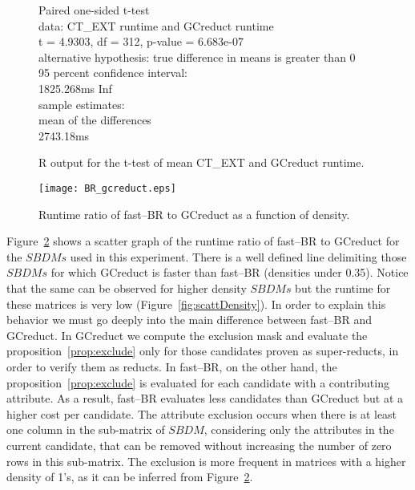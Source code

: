 \documentclass[authoryear,preprint,review,12pt]{elsarticle}
\begin{document}
	\begin{figure}
		\qquad{}	Paired one-sided t-test\\

		data:  CT\_EXT runtime and GCreduct runtime\\
		t = 4.9303, df = 312, p-value = 6.683e-07\\
		alternative hypothesis: true difference in means is greater than 0\\
		95 percent confidence interval:\\
		 1825.268ms  \qquad{}  Inf\\
		sample estimates:\\
		mean of the differences \\
		 \qquad{}    2743.18ms
		 
		\centering
	  	\caption{R output for the t-test of mean CT\_EXT and GCreduct runtime.}
	  	\label{fig:R_GCreduct}
	  	
	\end{figure}
		\begin{figure}[htb]
			\begin{center}
				\texttt{[image: BR\_gcreduct.eps]}
			\end{center}
			\caption{Runtime ratio of fast--BR to GCreduct as a function of density.}
			\label{fig:BRvsGAP}	
		\end{figure}
		
	Figure~\ref{fig:BRvsGAP} shows a scatter graph of the runtime ratio of fast--BR to GCreduct for the $SBDMs$ used in	this experiment. There is a well defined line delimiting those $SBDMs$ for which GCreduct is faster than fast--BR (densities under 0.35). Notice that the same can be observed for higher density $SBDMs$ but the runtime for these matrices is very low (Figure~\ref{fig:scattDensity}). In order to explain this behavior we must go deeply into the main difference between fast--BR and GCreduct. In GCreduct we compute the exclusion mask and evaluate the proposition~\ref{prop:exclude} only for those candidates proven as super-reducts, in order to verify them as reducts. In fast--BR, on the other hand, the proposition~\ref{prop:exclude} is evaluated for each candidate with a contributing attribute. As a result, fast--BR evaluates less candidates than GCreduct but at a higher cost per candidate. The attribute exclusion occurs when there is at least one column in the sub-matrix of $SBDM$, considering only the attributes in the current candidate, that can be removed without increasing the number of zero rows in this sub-matrix. The exclusion is more frequent in matrices with a higher density of 1's, as it can be inferred from  Figure~\ref{fig:BRvsGAP}. 
	
\end{document}

